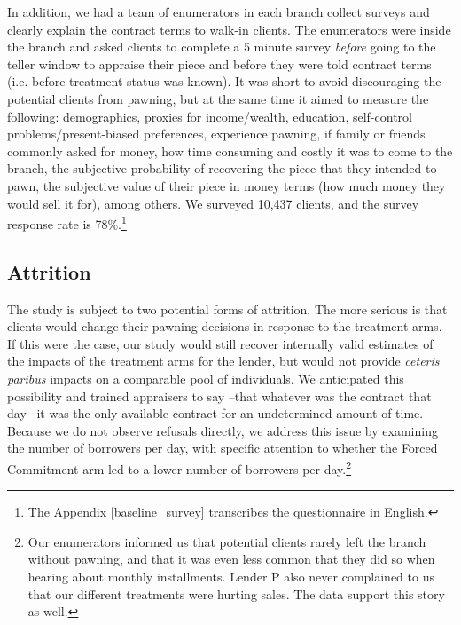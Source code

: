 \documentclass[oneside,11pt]{article}
\begin{document}
In addition, we had a team of enumerators in each branch collect surveys and clearly explain the contract terms to walk-in clients. The enumerators were inside the branch and asked clients to complete a 5 minute survey \textit{before} going to the teller window to appraise their piece and before they were told contract terms (i.e. before treatment status was known). It was short to avoid discouraging the potential clients from pawning, but at the same time it aimed to measure the following: demographics, proxies for income/wealth, education, self-control problems/present-biased preferences, experience pawning, if family or friends commonly asked for money, how time consuming and costly it was to come to the branch, the subjective probability of recovering the piece that they intended to pawn, the subjective value of their piece in money terms (how much money they would sell it for), among others. We surveyed 10,437 clients, and the survey response rate is 78\%.\footnote{The Appendix \ref{baseline_survey} transcribes the questionnaire in English.} %





\subsection{Attrition}

The study is subject to two potential forms of attrition.  The more serious is that clients would change their pawning decisions in response to the treatment arms.  If this were the case, our study would still recover internally valid estimates of the impacts of the treatment arms for the lender, but would not provide \textit{ceteris paribus} impacts on a comparable pool of individuals. We anticipated this possibility and trained appraisers to say --that whatever was the contract that day-- it was the only available contract for an undetermined amount of time.   Because we do not observe refusals directly, we address this issue by examining the number of borrowers per day, with specific attention to whether the Forced Commitment arm led to a lower number of borrowers per day.\footnote{Our enumerators informed us that potential clients rarely left the branch without pawning, and that it was even less common that they did so when hearing about monthly installments. Lender P also never complained to us that our different treatments were hurting sales. The data support this story as well.}
\end{document}
